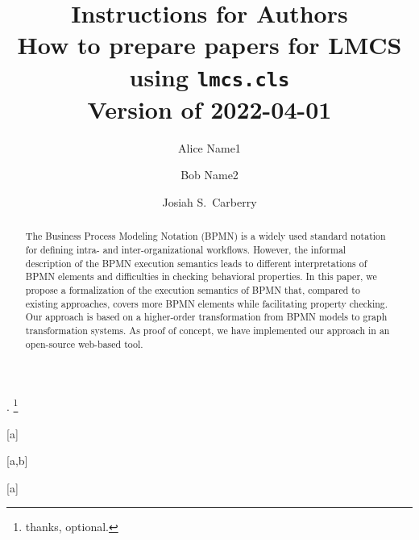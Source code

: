 \documentclass{lmcs} %
\theoremstyle{plain}\newtheorem{satz}[thm]{Satz} %
\begin{document}
\title[Instructions]{Instructions for Authors\\How to prepare papers
  for LMCS using \texorpdfstring{\MakeLowercase{\texttt{lmcs.cls}}}{lmcs.cls}\rsuper*\\Version of
  2022-04-01}
.
\thanks{thanks, optional.}	%

\author[A.~Name1]{Alice Name1}[a]
\author[B.~Name2]{Bob Name2}[a,b]
\author[J.~Name3]{Josiah S.~Carberry}[a]

\address{University 1, address1}	%

\address{University 2, address2}	%





\begin{abstract}
  \noindent
The Business Process Modeling Notation (BPMN) is a widely used standard notation for defining intra- and inter-organizational workflows.
However, the informal description of the BPMN execution semantics leads to different interpretations of BPMN elements and difficulties in checking behavioral properties.
In this paper, we propose a formalization of the execution semantics of BPMN that, compared to existing approaches, covers more BPMN elements while facilitating property checking.
Our approach is based on a higher-order transformation from BPMN models to graph transformation systems.
As proof of concept, we have implemented our approach in an open-source web-based tool.
\end{abstract}
\end{document}

